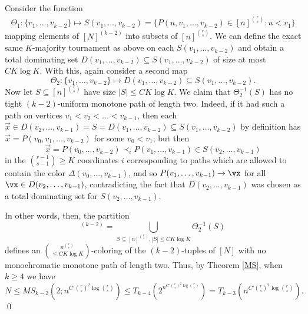     Consider the function
    \begin{align*}
         \Theta_1: \{v_1,...,v_{k-2}\} \longmapsto S(v_1,...,v_{k-2}) = \{P(u,v_1,...,v_{k-2}) \in [n]^{\binom{r}{s}}: u < v_1\}
    \end{align*}
    mapping elements of $[N]^{(k-2)}$ into subsets of $[n]^{\binom{r}{s}}$.
    We can define the exact same $K$-majority tournament as above on each $S(v_1,...,v_{k-2})$ and obtain a total dominating set $D(v_1,...,v_{k-2}) \subseteq S(v_1,...,v_{k-2})$ of size at most $C K \log K$.
    With this, again consider a second map
    \begin{equation*}
        \Theta_2: \{v_1,...,v_{k-2}\} \longmapsto D(v_1,...,v_{k-2}) \subseteq S(v_1,...,v_{k-2}).
    \end{equation*}
    Now let $S \subseteq [n]^{\binom{r}{s}}$ have size $|S| \le C K \log K$.
    We claim that $\Theta_2^{-1}(S)$ has no tight $(k-2)$-uniform monotone path of length two.
    Indeed, if it had such a path on vertices $v_1 < v_2 < ... < v_{k-1}$, then each $\Vec{x} \in D(v_2,...,v_{k-1}) = S = D(v_1,...,v_{k-2}) \subseteq S(v_1,...,v_{k-2})$ by definition has $\Vec{x} = P(v_0,v_1,...,v_{k-2})$ for some $v_0 < v_1$; but then
    \begin{equation*}
        \Vec{x} = P(v_0,...,v_{k-2}) \prec_i P(v_1,...,v_{k-1}) \in S(v_2,...,v_{k-1})
    \end{equation*}
    in the $\binom{r-1}{s-1} \geq K$ coordinates $i$ corresponding to paths which are allowed to contain the color $\Delta(v_0,...,v_{k-1})$,
    and so $P(v_1, \dots, v_{k-1}) \to \vx$ for all $\vx \in D(v_2, \dots, v_{k-1})$, contradicting the fact that $D(v_2,...,v_{k-1})$ was chosen as a total dominating set for $S(v_2,...,v_{k-1})$.
    
    In other words, then, the partition
    \begin{equation*}
        [N]^{(k-2)} = \bigcup_{S \subseteq [n]^{\binom{r}{s}}, |S| \le C K \log K} \Theta_2^{-1}(S)
    \end{equation*}
    defines an $\binom{n^{\binom{r}{s}}}{\le C K \log K}$-coloring of the $(k-2)$-tuples of $[N]$ with no monochromatic monotone path of length two.
    Thus, by Theorem \ref{MS}, when $k \geq 4$ we have
    \begin{equation*}
        N 
        \leq MS_{k-2} \left( 2; n^{C' \binom{r}{s}^2 \log \binom{r}{s}} \right) 
        \leq T_{k-4}\left(2^{n^{C' \binom{r}{s}^2 \log \binom{r}{s}}}\right)
        = T_{k-3} \left( n^{C' \binom{r}{s}^2 \log \binom{r}{s}} \right).
    \end{equation*}
\qed
